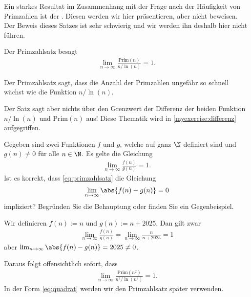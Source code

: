 Ein starkes Resultat im Zusammenhang mit der Frage nach der Häufigkeit von Primzahlen ist der . Diesen werden wir hier präsentieren, aber nicht beweisen. Der Beweis dieses Satzes ist sehr schwierig und wir werden ihn deshalb hier nicht führen.

\begin{mytheorem}[Primzahlsatz]\label{mytheorem:primzahlsatz}
	Der Primzahlsatz besagt
	\begin{align}\label{eq:primzahlsatz}
		\lim_{n\to\infty} \frac{\text{Prim}(n)}{n/\ln (n)} = 1.
	\end{align}
\end{mytheorem}
Der Primzahlsatz sagt, dass die Anzahl der Primzahlen ungefähr so schnell wächst wie die Funktion $n / \ln(n)$.

Der Satz sagt aber nichts über den Grenzwert der Differenz der beiden Funktion $n/\ln (n)$ und $\text{Prim}(n)$ aus! Diese Thematik wird in \cref{myexercise:differenz} aufgegriffen.

\begin{myexercise}\label{myexercise:differenz}
	Gegeben sind zwei Funktionen $f$ und $g$, welche auf ganz $\N$ definiert sind und $g(n) \neq 0$ für alle $n\in\N$. Es gelte die Gleichung
	\begin{align*}
		\lim_{n\to\infty}\frac{f(n)}{g(n)} = 1.
	\end{align*}
	Ist es korrekt, dass \cref{eq:primzahlsatz} die Gleichung
	\begin{align*}
		\lim_{n\to\infty} \abs{f(n) - g(n)} = 0
	\end{align*}
	impliziert? Begründen Sie die Behauptung oder finden Sie ein Gegenbeispiel.
	\begin{myanswer}
		Wir definieren $f(n) := n$ und $g(n) := n + 2025$. Dan gilt zwar
		\begin{align*}
			\lim_{n\to\infty}\frac{f(n)}{g(n)} = \lim_{n\to\infty}\frac{n}{n + 2025} = 1
		\end{align*}
		aber $\lim_{n\to\infty} \abs{f(n) - g(n)} = 2025 \neq 0$.
	\end{myanswer}
\end{myexercise}

Daraus folgt offensichtlich sofort, dass
\begin{align}\label{eq:quadrat}
	\lim_{n\to\infty} \frac{\text{Prim}(n^2)}{n^2/\ln (n^2)} = 1.
\end{align}
In der Form \ref{eq:quadrat} werden wir den Primzahlsatz später verwenden.

